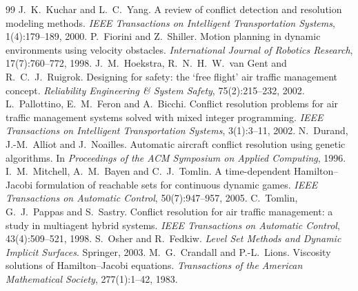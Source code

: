 \documentclass[11pt,a4paper]{article}
\begin{document}
\begin{thebibliography}{99}\small
{} J.~K.~Kuchar and L.~C.~Yang. A review of conflict detection and resolution modeling methods.
\emph{IEEE Transactions on Intelligent Transportation Systems}, 1(4):179--189, 2000.
 P.~Fiorini and Z.~Shiller. Motion planning in dynamic environments using velocity obstacles.
\emph{International Journal of Robotics Research}, 17(7):760--772, 1998.
 J.~M.~Hoekstra, R.~N.~H.~W.~van Gent and R.~C.~J.~Ruigrok. Designing for safety: the
`free flight' air traffic management concept. \emph{Reliability Engineering \& System Safety}, 75(2):215--232, 2002.
 L.~Pallottino, E.~M.~Feron and A.~Bicchi. Conflict resolution problems for air traffic
management systems solved with mixed integer programming. \emph{IEEE Transactions on Intelligent Transportation
Systems}, 3(1):3--11, 2002.
 N.~Durand, J.-M.~Alliot and J.~Noailles. Automatic aircraft conflict resolution using genetic
algorithms. In \emph{Proceedings of the ACM Symposium on Applied Computing}, 1996.
 I.~M.~Mitchell, A.~M.~Bayen and C.~J.~Tomlin. A time-dependent Hamilton--Jacobi formulation of
reachable sets for continuous dynamic games. \emph{IEEE Transactions on Automatic Control}, 50(7):947--957, 2005.
 C.~Tomlin, G.~J.~Pappas and S.~Sastry. Conflict resolution for air traffic management: a study in
multiagent hybrid systems. \emph{IEEE Transactions on Automatic Control}, 43(4):509--521, 1998.
 S.~Osher and R.~Fedkiw. \emph{Level Set Methods and Dynamic Implicit Surfaces}. Springer, 2003.
 M.~G.~Crandall and P.-L.~Lions. Viscosity solutions of Hamilton--Jacobi equations.
\emph{Transactions of the American Mathematical Society}, 277(1):1--42, 1983.
\end{thebibliography}

\appendix
\end{document}
